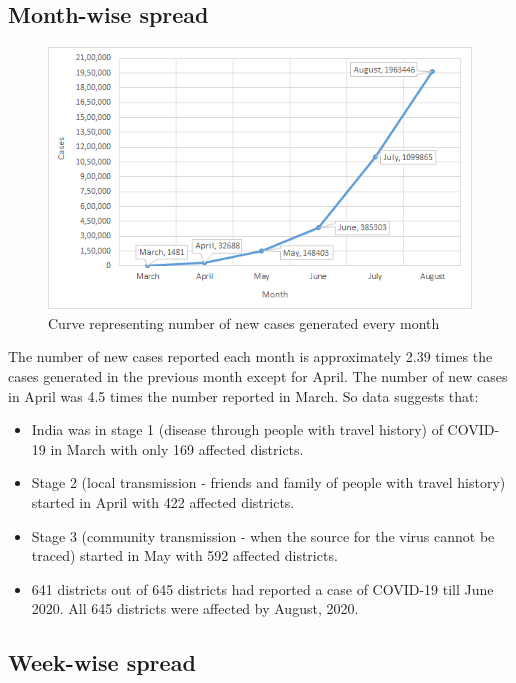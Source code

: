 \documentclass{article}
\begin{document}
	

\subsection{Month-wise spread}

\begin{figure}[h]
    \centering
    \includegraphics{MonthvsCases}
    \caption{Curve representing number of new cases generated every month }
\end{figure}
The number of new cases reported each month is approximately 2.39 times the cases generated in the previous month except for April. The number of new cases in April was 4.5 times the number reported in March. So data suggests that:
\begin{itemize}
    \item India was in stage 1 (disease through people with travel history) of COVID-19 in March with only 169 affected districts. 
    \item Stage 2 (local transmission - friends and family of people with travel history) started in April with 422 affected districts.
    \item Stage 3 (community transmission - when the source for the virus cannot be traced) started in May with 592 affected districts.
   \item 641 districts out of 645 districts had reported a case of COVID-19 till June 2020. All 645 districts were affected by August, 2020.
\end{itemize}

\subsection{Week-wise spread}
\end{document}
